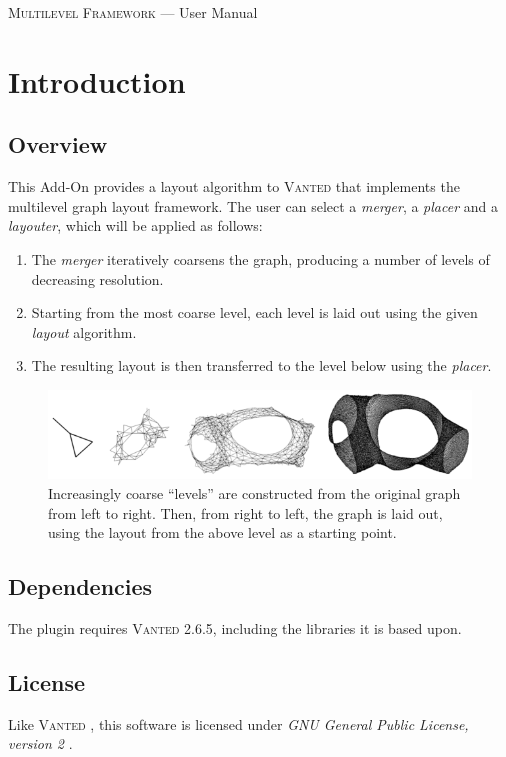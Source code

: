 \documentclass{tufte-handout}
\begin{document}
\textsc{Multilevel Framework} --- User Manual

  \setlength{\parindent}{0em}
  \setlength{\parskip}{0.75em}

  \section{Introduction}
  \subsection{Overview}
  This Add-On provides a layout algorithm to \textsc{Vanted} that implements the
  multilevel graph layout framework. The user can select a \textit{merger}, a
  \textit{placer} and a \textit{layouter}, which will be applied as follows:
  \begin{enumerate}
  \item The \textit{merger} iteratively coarsens the graph, producing a number
    of levels of decreasing resolution.
  \item Starting from the most coarse level, each level is laid out using the
    given \textit{layout} algorithm.
  \item The resulting layout is then transferred to the level below using the
    \textit{placer}.
  \end{enumerate}

  \begin{figure}
    \centering
    \includegraphics{coarsening}
    \caption{Increasingly coarse ``levels'' are constructed from the original
      graph from left to right. Then, from right to left, the graph is laid out,
    using the layout from the above level as a starting point.}
  \end{figure}

  \subsection{Dependencies}
  The plugin requires \textsc{Vanted} 2.6.5, including the libraries it is based upon.

  \subsection{License}
  Like \textsc{Vanted}
  , this software is licensed under \textit{GNU General
    Public License, version 2}
  .
\end{document}
